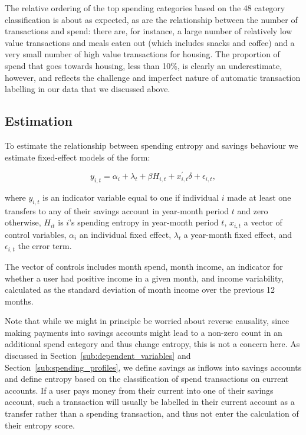 The relative ordering of the top spending categories based on the 48 category
classification is about as expected, as are the relationship between the number
of transactions and spend: there are, for instance, a large number of
relatively low value transactions and meals eaten out (which includes snacks
and coffee) and a very small number of high value transactions for housing. The
proportion of spend that goes towards housing, less than 10\%, is clearly an
underestimate, however, and reflects the challenge and imperfect nature of
automatic transaction labelling in our data that we discussed above.

\subsection{Estimation}%
\label{sub:estimation}

To estimate the relationship between spending entropy and savings behaviour we
estimate fixed-effect models of the form: 

\begin{equation}
    \label{equ:model}
    y_{i,t} = \alpha_i + \lambda_t + \beta H_{i,t} + x^\prime_{i,t} \delta +
    \epsilon_{i,t},
\end{equation}

\noindent where $y_{i,t}$ is an indicator variable equal to one if individual
$i$ made at least one transfers to any of their savings account in year-month
period $t$ and zero otherwise, $H_{it}$ is $i$'s spending entropy in year-month
period $t$, $x_{i,t}$ a vector of control variables, $\alpha_i$ an individual
fixed effect, $\lambda_t$ a year-month fixed effect, and $\epsilon_{i, t}$ the
error term.

The vector of controls includes month spend, month income, an indicator for
whether a user had positive income in a given month, and income
variability, calculated as the standard deviation of month income over the
previous 12 months.

Note that while we might in principle be worried about reverse causality, since
making payments into savings accounts might lead to a non-zero count in an
additional spend category and thus change entropy, this is not a concern here.
As discussed in Section~\ref{sub:dependent_variables} and
Section~\ref{sub:spending_profiles}, we define savings as inflows into savings
accounts and define entropy based on the classification of spend transactions
on current accounts. If a user pays money from their current into one of their
savings account, such a transaction will usually be labelled in their current
account as a transfer rather than a spending transaction, and thus not enter
the calculation of their entropy score.

